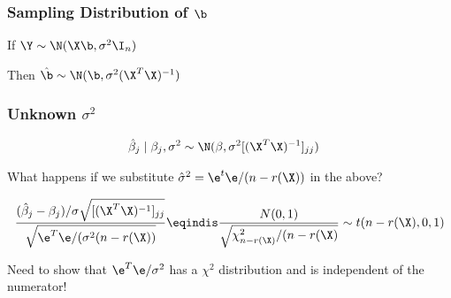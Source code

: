 \documentclass[handout]{beamer}
\begin{document}



\begin{frame}
  \frametitle{Sampling Distribution of $\b$}
If  $\Y \sim \N(\X\b, \sigma^2 \I_n)$

Then $\hat{\b} \sim \N(\b, \sigma^2 (\X^T\X)^{-1})$
\vfill

\end{frame}


\begin{frame} \frametitle{Unknown $\sigma^2$}

  \begin{align*}
    \hat{\beta}_j \mid \beta_j, \sigma^2 & \sim \N(\beta, { \sigma^2}
                                           [(\X^T\X)^{-1}]_{jj})
  \end{align*}  \pause

What happens if we substitute $\hat{\sigma}^2 = \e^t\e/(n-r(\X))$ in the above? \pause

$$
\frac{(\hat{\beta}_j - \beta_j)/ \sigma \sqrt{ [(\X^T\X)^{-1}]_{jj}}}
{\sqrt{\e^T\e/ (\sigma^2 (n - r(\X))} } \eqindis
\frac{N(0,1)}{\sqrt{\chi_{n-r(\X)}^2/(n - r(\X)}} \sim t(n - r(\X), 0 ,1)
$$

Need to show that $\e^T\e /\sigma^2$ has a $\chi^2$ distribution and
is independent of the numerator!
\end{frame}
\end{document}
